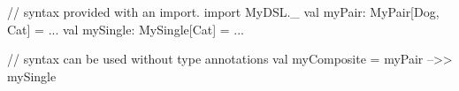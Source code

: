 // syntax provided with an import.
            import MyDSL._
            val myPair: MyPair[Dog, Cat] = ...
            val mySingle: MySingle[Cat] = ...
            
            // syntax can be used without type annotations
            val myComposite = myPair -->> mySingle